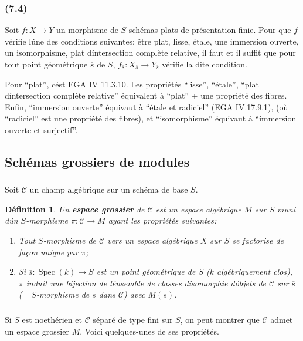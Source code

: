 \documentclass{amsart}
\theoremstyle{plain}
\newtheorem{definition}[theorem]{D\'efinition}
\theoremstyle{remark}
\DeclareMathOperator{\Spec}{Spec}
\begin{document}
\subsubsection*{(7.4)}
Soit $f: X \to Y$ un morphisme de $S$-sch\'emas plats de pr\'esentation finie. Pour que
$f$ v\'erifie l\'une des conditions suivantes: \^etre plat, lisse, \'etale, une immersion
ouverte, un isomorphisme, plat d\'intersection compl\`ete relative, il faut et il suffit
que pour tout point g\'eom\'etrique $\overline{s}$ de $S$,
$f_{\overline{s}}: X_{\overline{s}} \to Y_{\overline{s}}$ v\'erifie la dite condition.

Pour ``plat'', c\'est EGA IV 11.3.10. Les propri\'et\'es ``lisse'', ``\'etale'',
``plat d\'intersection compl\`ete relative'' \'equivalent \`a ``plat'' + une propri\'et\'e
des fibres. Enfin, ``immersion ouverte'' \'equivaut \`a ``\'etale et radiciel''
(EGA IV.17.9.1), (o\`u ``radiciel'' est une propri\'et\'e des fibres), et ``isomorphisme''
\'equivaut \`a ``immersion ouverte et surjectif''.

\subsection{Sch\'emas grossiers de modules}

\subsubsection{}
Soit $\mathscr{C}$ un champ alg\'ebrique sur un sch\'ema de base $S$.

\begin{definition}
Un \textbf{espace grossier} de $\mathscr{C}$ est un espace alg\'ebrique $M$ sur $S$ muni d\'un
$S$-morphisme $\pi: \mathscr{C} \to M$ ayant les propri\'et\'es suivantes:
\begin{enumerate}
\item[(i)] Tout $S$-morphisme de $\mathscr{C}$ vers un espace alg\'ebrique $X$ sur $S$ se factorise
de fa\c{c}on unique par $\pi$;
\item[(ii)] Si $\overline{s}: \Spec(k) \to S$ est un point g\'eom\'etrique de $S$ ($k$
alg\'ebriquement clos), $\pi$ induit une bijection de l\'ensemble de classes d\'isomorphie
d\'objets de $\mathscr{C}$ sur $\overline{s}$ (= $S$-morphisme de $\overline{s}$ dans $\mathscr{C}$) avec
$M(\overline{s})$.
\end{enumerate}
\end{definition}

\subsubsection{}
Si $S$ est noeth\'erien et $\mathscr{C}$ s\'epar\'e de type fini sur $S$, on peut montrer que
$\mathscr{C}$ admet un espace grossier $M$. Voici quelques-unes de ses propri\'et\'es.
\end{document}

